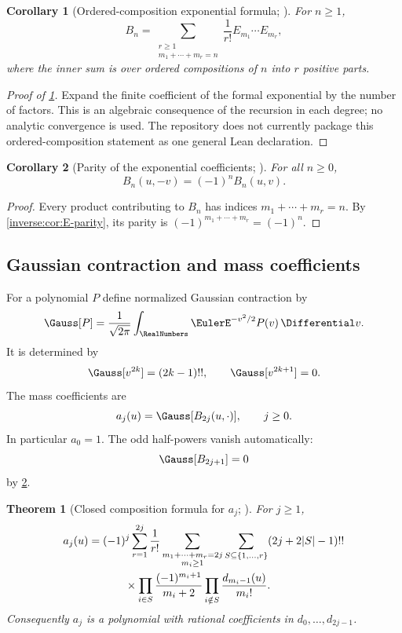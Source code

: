 \documentclass[11pt,oneside]{article}
\newtheorem{theorem}{Theorem}[section]
\newtheorem{corollary}[corollary]{Corollary}
\theoremstyle{definition}
\theoremstyle{remark}
\begin{document}
\begin{corollary}[Ordered-composition exponential formula; \Derived]
\label{inverse:cor:exp-composition}
For \(n\geq1\),
\[
 B_n=\sum_{\substack{r\geq1\\m_1+\cdots+m_r=n}}
 \frac1{r!}E_{m_1}\cdots E_{m_r},
\]
where the inner sum is over ordered compositions of $n$ into $r$ positive
parts.
\end{corollary}

\begin{proof}[Proof of \cref{inverse:cor:exp-composition}]
Expand the finite coefficient of the formal exponential by the number of factors.  This is
an algebraic consequence of the recursion in each degree; no analytic convergence is used.
The repository does not currently package this ordered-composition statement as one general
Lean declaration.
\end{proof}

\begin{corollary}[Parity of the exponential coefficients; \Formalized]
\label{inverse:cor:B-parity}
For all $n\geq0$,
\[
 B_n(u,-v)=(-1)^nB_n(u,v).
\]
\end{corollary}

\begin{proof}
Every product contributing to $B_n$ has indices
$m_1+\cdots+m_r=n$.  By \cref{inverse:cor:E-parity}, its parity is
$(-1)^{m_1+\cdots+m_r}=(-1)^n$.
\end{proof}

\subsection{Gaussian contraction and mass coefficients}

For a polynomial $P$ define normalized Gaussian contraction by
\[
 \Gauss[P]
 =\frac1{\sqrt{2\pi}}\int_{\RealNumbers}\EulerE^{-v^2/2}P(v)\,\Differential v.
\]
It is determined by
\begin{equation}
 \Gauss[v^{2k}]=(2k-1)!!,\qquad
 \Gauss[v^{2k+1}]=0. \label{inverse:eq:gaussian-moments}
\end{equation}
The mass coefficients are
\begin{equation}
 a_j(u)=\Gauss[B_{2j}(u,\cdot)],\qquad j\geq0.
 \label{inverse:eq:mass-coeff-definition}
\end{equation}
In particular $a_0=1$.  The odd half-powers vanish automatically:
\[
 \Gauss[B_{2j+1}]=0
\]
by \cref{inverse:cor:B-parity}.

\begin{theorem}[Closed composition formula for \(a_j\); \Derived]
\label{inverse:thm:mass-composition}
For $j\geq1$,
\begin{align}
 a_j(u)
 ={}&(-1)^j
 \sum_{r=1}^{2j}\frac1{r!}
 \sum_{\substack{m_1+\cdots+m_r=2j\\m_i\geq1}}
 \sum_{S\subseteq\{1,\dots,r\}}
 (2j+2|S|-1)!! \notag\\
 &\qquad{}\times
 \prod_{i\in S}\frac{(-1)^{m_i+1}}{m_i+2}
 \prod_{i\notin S}\frac{d_{m_i-1}(u)}{m_i!}.
 \label{inverse:eq:mass-composition}
\end{align}
Consequently $a_j$ is a polynomial with rational coefficients in
$d_0,\dots,d_{2j-1}$.
\end{theorem}
\end{document}
